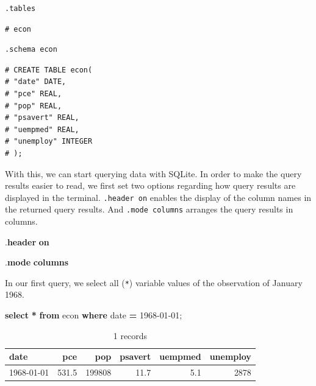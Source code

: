 \documentclass[
  12pt,
]{style/krantz}
\newenvironment{Shaded}{\begin{snugshade}}{\end{snugshade}}
\newcommand{\DataTypeTok}[1]{\textcolor[rgb]{0.13,0.29,0.53}{#1}}
\newcommand{\KeywordTok}[1]{\textcolor[rgb]{0.13,0.29,0.53}{\textbf{#1}}}
\newcommand{\NormalTok}[1]{#1}
\newcommand{\OperatorTok}[1]{\textcolor[rgb]{0.81,0.36,0.00}{\textbf{#1}}}
\newcommand{\StringTok}[1]{\textcolor[rgb]{0.31,0.60,0.02}{#1}}
\begin{document}
\begin{verbatim}
.tables
\end{verbatim}

\begin{verbatim}
# econ
\end{verbatim}

\begin{verbatim}
.schema econ
\end{verbatim}

\begin{verbatim}
# CREATE TABLE econ(
# "date" DATE,
# "pce" REAL,
# "pop" REAL,
# "psavert" REAL,
# "uempmed" REAL,
# "unemploy" INTEGER
# );
\end{verbatim}

With this, we can start querying data with SQLite. In order to make the query results easier to read, we first set two options regarding how query results are displayed in the terminal. \texttt{.header\ on} enables the display of the column names in the returned query results. And \texttt{.mode\ columns} arranges the query results in columns.

\begin{Shaded}
\begin{Highlighting}[]
\NormalTok{.}\KeywordTok{header} \KeywordTok{on}
\end{Highlighting}
\end{Shaded}

\begin{Shaded}
\begin{Highlighting}[]
\NormalTok{.}\KeywordTok{mode} \KeywordTok{columns}
\end{Highlighting}
\end{Shaded}

In our first query, we select all (\texttt{*}) variable values of the observation of January 1968.

\begin{Shaded}
\begin{Highlighting}[]
\KeywordTok{select} \OperatorTok{*} \KeywordTok{from}\NormalTok{ econ }\KeywordTok{where} \DataTypeTok{date} \OperatorTok{=} \StringTok{\textquotesingle{}1968{-}01{-}01\textquotesingle{}}\NormalTok{;}
\end{Highlighting}
\end{Shaded}

\begin{table}

\caption{\label{tab:unnamed-chunk-61}1 records}
\centering
\begin{tabular}[t]{l|r|r|r|r|r}
\hline
date & pce & pop & psavert & uempmed & unemploy\\
\hline
1968-01-01 & 531.5 & 199808 & 11.7 & 5.1 & 2878\\
\hline
\end{tabular}
\end{table}
\end{document}
